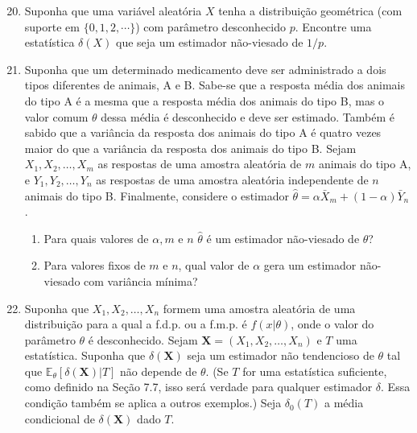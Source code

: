 \documentclass[leqno, 12pt]{article}
\theoremstyle{definition}
\newcommand{\rs}{X_1, X_2, \ldots, X_n} %
\newcommand{\bX}{\boldsymbol{X}} %
\begin{document}
\begin{enumerate}
\setcounter{enumi}{19}


\item \textbf{\parencite[ex. 4, pág. 512]{DeGroot:2014}} Suponha que uma variável aleatória \(X\) tenha a distribuição geométrica (com suporte em \(\{0,1,2, \cdots\}\)) com parâmetro desconhecido \(p\). Encontre uma estatística \(\delta(X)\) que seja um estimador não-viesado de \(1/p\).



\item \textbf{\parencite[ex. 11, pág. 513]{DeGroot:2014}} Suponha que um determinado medicamento deve ser administrado a dois tipos diferentes de animais, A e B. Sabe-se que a resposta média dos animais do tipo A é a mesma que a resposta média dos animais do tipo B, mas o valor comum \(\theta\) dessa média é desconhecido e deve ser estimado. Também é sabido que a variância da resposta dos animais do tipo A é quatro vezes maior do que a variância da resposta dos animais do tipo B. Sejam \(X_1, X_2, \ldots, X_m\) as respostas de uma amostra aleatória de \(m\) animais do tipo A, e \(Y_1, Y_2, \ldots, Y_n\) as respostas de uma amostra aleatória independente de \(n\) animais do tipo B. Finalmente, considere o estimador \(\hat{\theta} = \alpha \bar{X}_m + (1 - \alpha) \bar{Y}_n\).

\begin{enumerate}
    \item Para quais valores de \(\alpha, m\) e \(n\) \(\hat{\theta}\) é um estimador não-viesado de \(\theta\)?

    \item Para valores fixos de $m$ e $n$, qual valor de $\alpha$ gera um estimador não-viesado com variância mínima?
\end{enumerate}


\item \textbf{\parencite[ex. 13, pág. 513]{DeGroot:2014}} Suponha que \(\rs\) formem uma amostra aleatória de uma distribuição para a qual a f.d.p. ou a f.m.p. é \(f(x|\theta)\), onde o valor do parâmetro \(\theta\) é desconhecido. Sejam \(\bX = (\rs)\) e \(T\) uma estatística. Suponha que \(\delta(\bX)\) seja um estimador não tendencioso de \(\theta\) tal que \(\mathbb{E}_{\theta}[\delta(\bX)|T]\) não depende de \(\theta\). (Se \(T\) for uma estatística suficiente, como definido na Seção 7.7, isso será verdade para qualquer estimador \(\delta\). Essa condição também se aplica a outros exemplos.) Seja \(\delta_0(T)\) a média condicional de \(\delta(\bX)\) dado \(T\).


\end{enumerate}
\end{document}
